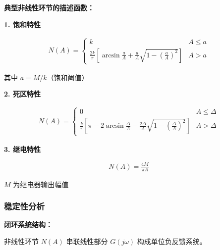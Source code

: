 \begin{minipage}[t]{0.45\textwidth}
\vspace{0pt}
\textbf{典型非线性环节的描述函数：}

\textbf{1. 饱和特性}

\begin{center}
\end{center}

\begin{align*}
N(A) = \begin{cases}
k & A \leq a \\
\frac{2k}{\pi}\left[\arcsin\frac{a}{A} + \frac{a}{A}\sqrt{1-\left(\frac{a}{A}\right)^2}\right] & A > a
\end{cases}
\end{align*}

其中 $a = M/k$（饱和阈值）

\textbf{2. 死区特性}

\begin{align*}
N(A) = \begin{cases}
0 & A \leq \Delta \\
\frac{k}{\pi}\left[\pi - 2\arcsin\frac{\Delta}{A} - \frac{2\Delta}{A}\sqrt{1-\left(\frac{\Delta}{A}\right)^2}\right] & A > \Delta
\end{cases}
\end{align*}

\textbf{3. 继电特性}

\begin{align*}
N(A) = \frac{4M}{\pi A}
\end{align*}

$M$ 为继电器输出幅值
\end{minipage}

\subsubsection{稳定性分析}

\textbf{闭环系统结构：}

非线性环节 $N(A)$ 串联线性部分 $G(j\omega)$ 构成单位负反馈系统。

